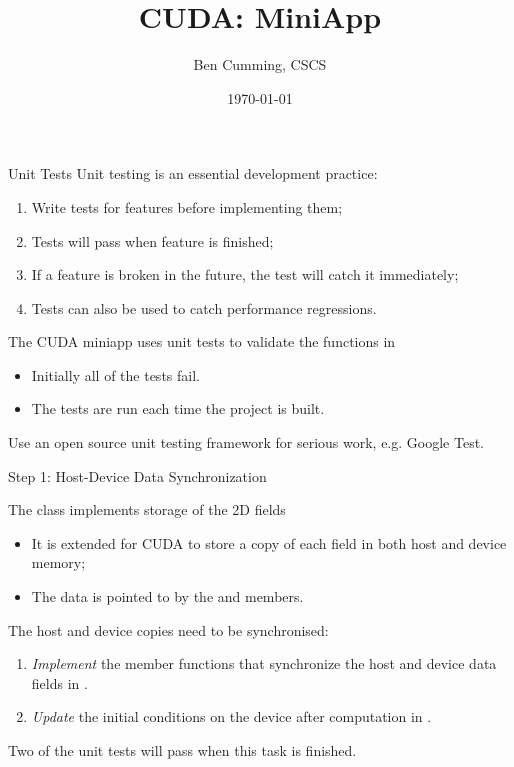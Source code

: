 \documentclass[aspectratio=43]{beamer}
\author{Ben Cumming, CSCS}
\title{CUDA: MiniApp}
\subtitle{}
\date{\today}
\begin{document}
\cscstitle

\begin{frame}[fragile]{Unit Tests}
    Unit testing is an essential development practice:
    \begin{enumerate}
        \item Write tests for features before implementing them;
        \item Tests will pass when feature is finished;
        \item If a feature is broken in the future, the test will catch it immediately;
        \item Tests can also be used to catch performance regressions.
    \end{enumerate}
    The CUDA miniapp uses unit tests to validate the functions in 
    \begin{itemize}
        \item Initially all of the tests fail.
        \item The tests are run each time the project is built.
    \end{itemize}
    Use an open source unit testing framework for serious work, e.g. Google Test.
\end{frame}

\begin{frame}[fragile]{Step 1: Host-Device Data Synchronization}
    \begin{info}{The  class implements storage of the 2D fields}
        \begin{itemize}
            \item It is extended for CUDA to store a copy of each field in both host and device memory;
            \item The data is pointed to by the  and  members.
        \end{itemize}
    \end{info}
    The host and device copies need to be synchronised:
    \begin{enumerate}
        \item \emph{Implement} the member functions that synchronize the host and device data fields in .
        \item \emph{Update} the initial conditions on the device after computation in .
    \end{enumerate}
    \begin{info}{}
        Two of the unit tests will pass when this task is finished.
    \end{info}
\end{frame}
\end{document}
